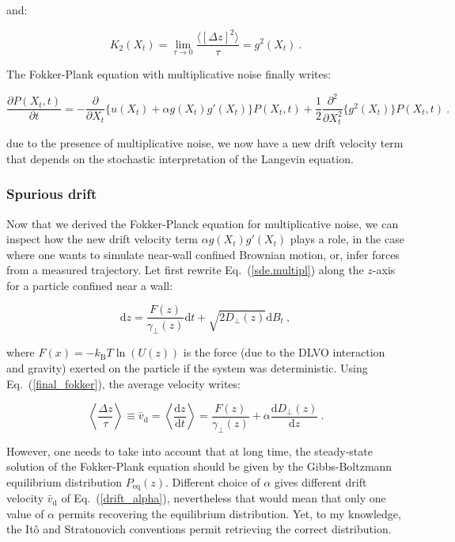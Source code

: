 and:

\begin{equation}
	K_2(X_t) = \lim\limits_{\tau \rightarrow 0} \frac{\langle [\Delta z]^2\rangle}{\tau} = g^2(X_t) ~.
\end{equation}

The Fokker-Plank equation with multiplicative noise finally writes:

\begin{equation}
	\frac{\partial P(X_t, t)}{\partial t} = -\frac{\partial}{\partial X_t} \{u(X_t) + \alpha g(X_t)g'(X_t)\} P(X_t, t) + \frac{1}{2}\frac{\partial^2}{\partial X_t^2} \{g^2(X_t) \} P(X_t, t)~.
	\label{final_fokker}
\end{equation} 

due to the presence of multiplicative noise, we now have a new drift velocity term that depends on the stochastic interpretation of the Langevin equation.

\subsubsection{Spurious drift}
\label{sec:spurious}

Now that we derived the Fokker-Planck equation for multiplicative noise, we can inspect how the new drift velocity term $\alpha g(X_t)g'(X_t)$ plays a role, in the case where one wants to simulate near-wall confined Brownian motion, or, infer forces from a measured trajectory. Let first rewrite Eq.~(\ref{sde.multipl}) along the $z$-axis for a particle confined near a wall:

\begin{equation}
	\mathrm{d}z = \frac{F(z)}{\gamma_\bot (z)} \mathrm{d}t + \sqrt{2 D_\bot(z)}\mathrm{d}B_t ~,
\end{equation}

where $F(x)=-k_\mathrm{B}T \ln (U(z))$ is the force (due to the DLVO interaction and gravity) exerted on the particle if the system was deterministic. Using Eq.~(\ref{final_fokker}), the average velocity writes:

\begin{equation}
	\left\langle \frac{\Delta z}{ \tau} \right\rangle  \equiv \bar{v}_\mathrm{d}
	=\left\langle \frac{\mathrm{d}z}{\mathrm{d}t} \right\rangle = \frac{F(z)}{\gamma_\bot (z)} + \alpha \frac{\mathrm{d} D_\bot(z)}{\mathrm{d}z} ~. 
	\label{drift_alpha}
\end{equation}

However, one needs to take into account that at long time, the steady-state solution of the Fokker-Plank equation should be given by the Gibbs-Boltzmann equilibrium distribution $P_\mathrm{eq}(z)$. Different choice of $\alpha$ gives different drift velocity $\bar{v}_\mathrm{d}$ of Eq.~(\ref{drift_alpha}), nevertheless that would mean that only one value of $\alpha$ permits recovering the equilibrium distribution. Yet, to my knowledge, the Itô and Stratonovich conventions permit retrieving the correct distribution. 

